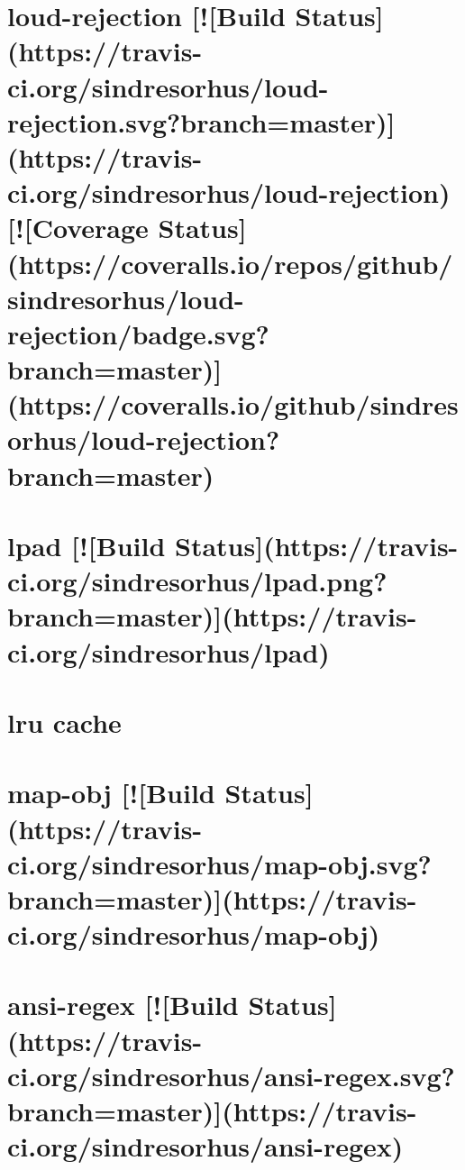 \documentclass[twoside]{book}
\newcommand{\+}{\discretionary{\mbox{\scriptsize$\hookleftarrow$}}{}{}}
\begin{document}
\chapter{loud-\/rejection \mbox{[}!\mbox{[}Build Status\mbox{]}(https\+://travis-\/ci.org/sindresorhus/loud-\/rejection.svg?branch=master)\mbox{]}(https\+://travis-\/ci.org/sindresorhus/loud-\/rejection) \mbox{[}!\mbox{[}Coverage Status\mbox{]}(https\+://coveralls.io/repos/github/sindresorhus/loud-\/rejection/badge.svg?branch=master)\mbox{]}(https\+://coveralls.io/github/sindresorhus/loud-\/rejection?branch=master)}
\label{md_app_web_node_modules_loud-rejection_readme}

\chapter{lpad \mbox{[}!\mbox{[}Build Status\mbox{]}(https\+://travis-\/ci.org/sindresorhus/lpad.png?branch=master)\mbox{]}(https\+://travis-\/ci.org/sindresorhus/lpad)}
\label{md_app_web_node_modules_lpad_readme}

\chapter{lru cache}
\label{md_app_web_node_modules_lru-cache__r_e_a_d_m_e}

\chapter{map-\/obj \mbox{[}!\mbox{[}Build Status\mbox{]}(https\+://travis-\/ci.org/sindresorhus/map-\/obj.svg?branch=master)\mbox{]}(https\+://travis-\/ci.org/sindresorhus/map-\/obj)}
\label{md_app_web_node_modules_map-obj_readme}

\chapter{ansi-\/regex \mbox{[}!\mbox{[}Build Status\mbox{]}(https\+://travis-\/ci.org/sindresorhus/ansi-\/regex.svg?branch=master)\mbox{]}(https\+://travis-\/ci.org/sindresorhus/ansi-\/regex)}
\label{md_app_web_node_modules_maxmin_node_modules_ansi-regex_readme}

\end{document}
